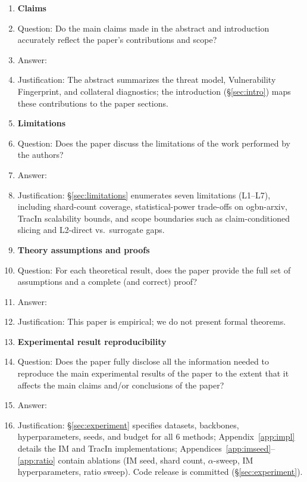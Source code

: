 
\begin{enumerate}

\item {\bf Claims}
    \item[] Question: Do the main claims made in the abstract and introduction accurately reflect the paper's contributions and scope?
    \item[] Answer: \answerYes{}
    \item[] Justification: The abstract summarizes the threat model, Vulnerability Fingerprint, and collateral diagnostics; the introduction (\S\ref{sec:intro}) maps these contributions to the paper sections.

\item {\bf Limitations}
    \item[] Question: Does the paper discuss the limitations of the work performed by the authors?
    \item[] Answer: \answerYes{}
    \item[] Justification: \S\ref{sec:limitations} enumerates seven limitations (L1--L7), including shard-count coverage, statistical-power trade-offs on ogbn-arxiv, TracIn scalability bounds, and scope boundaries such as claim-conditioned slicing and L2-direct vs.\ surrogate gaps.

\item {\bf Theory assumptions and proofs}
    \item[] Question: For each theoretical result, does the paper provide the full set of assumptions and a complete (and correct) proof?
    \item[] Answer: \answerNA{}
    \item[] Justification: This paper is empirical; we do not present formal theorems.

\item {\bf Experimental result reproducibility}
    \item[] Question: Does the paper fully disclose all the information needed to reproduce the main experimental results of the paper to the extent that it affects the main claims and/or conclusions of the paper?
    \item[] Answer: \answerYes{}
    \item[] Justification: \S\ref{sec:experiment} specifies datasets, backbones, hyperparameters, seeds, and budget for all 6 methods; Appendix~\ref{app:impl} details the IM and TracIn implementations; Appendices~\ref{app:imseed}--\ref{app:ratio} contain ablations (IM seed, shard count, $\alpha$-sweep, IM hyperparameters, ratio sweep). Code release is committed (\S\ref{sec:experiment}).


\end{enumerate}
